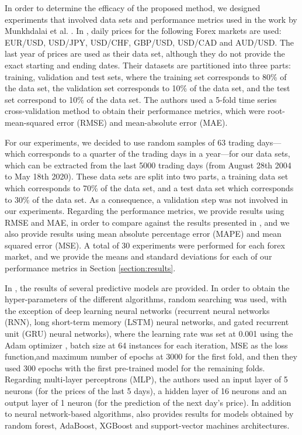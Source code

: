\documentclass{ieeeaccess}
\begin{document}
In order to determine the efficacy of the proposed method, we designed
experiments that involved data sets and performance metrics used in
the work by Munkhdalai et al. \cite{Munkhdalai2019}. In
\cite{Munkhdalai2019}, daily prices for the following Forex markets
are used: EUR/USD, USD/JPY, USD/CHF, GBP/USD, USD/CAD and AUD/USD. The last
year of prices are used as their data set, although they do not
provide the exact starting and ending dates. Their datasets are
partitioned into three parts: training, validation and test sets,
where the training set corresponds to 80\% of the data set, the
validation set corresponds to 10\% of the data set, and the test set
correspond to 10\% of the data set. The authors used a 5-fold time
series cross-validation method to obtain their performance metrics,
which were root-mean-squared error (RMSE) and mean-absolute error (MAE).

For our experiments, we decided to use random samples of 63 trading
days---which corresponds to a quarter of the trading days in a
year---for our data sets, which can be extracted from the last 5000
trading days (from August 28th 2004 to May 18th 2020). These data sets
are split into two parts, a training data set which corresponds to
70\% of the data set, and a test data set which corresponds to 30\% of
the data set. As a consequence, a validation step was not involved in
our experiments. Regarding the performance metrics, we provide results
using RMSE and MAE, in order to compare against the results presented
in \cite{Munkhdalai2019}, and we also provide results using mean
absolute percentage error (MAPE) and mean squared error (MSE). A total
of 30 experiments were performed for each forex market, and we provide
the means and standard deviations for each of our performance metrics
in Section \ref{section:results}.

In \cite{Munkhdalai2019}, the results of several predictive models are
provided. In order to obtain the hyper-parameters of the different
algorithms, random searching was used, with the exception of deep
learning neural networks (recurrent neural networks (RNN), long
short-term memory (LSTM) neural networks, and gated recurrent unit
(GRU) neural networks), where the learning rate was set at 0.001 using
the Adam optimizer \cite{kingma2014adam}, batch size at 64 instances
for each iteration, MSE as the loss function,and maximum number of
epochs at 3000 for the first fold, and then they used 300 epochs with
the first pre-trained model for the remaining folds. Regarding
multi-layer perceptrons (MLP), the authors used an input layer of 5 neurons
(for the prices of the last 5 days), a hidden layer of 16 neurons and
an output layer of 1 neuron (for the prediction of the next day's
price). In addition to neural network-based algorithms,
\cite{kingma2014adam} also provides results for models obtained by
random forest, AdaBoost, XGBoost and support-vector machines
architectures.
\end{document}
